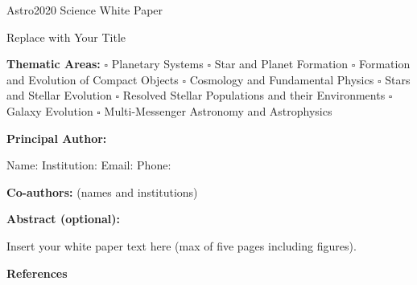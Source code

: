 \documentclass[12pt]{article}
\begin{document}
\raggedright
\huge
Astro2020 Science White Paper \linebreak

Replace with Your Title \linebreak
\normalsize

\noindent \textbf{Thematic Areas:} \hspace*{60pt} $\square$ Planetary Systems \hspace*{10pt} $\square$ Star and Planet Formation \hspace*{20pt}\linebreak
$\square$ Formation and Evolution of Compact Objects \hspace*{31pt} $\square$ Cosmology and Fundamental Physics \linebreak
  $\square$  Stars and Stellar Evolution \hspace*{1pt} $\square$ Resolved Stellar Populations and their Environments \hspace*{40pt} \linebreak
  $\square$    Galaxy Evolution   \hspace*{45pt} $\square$             Multi-Messenger Astronomy and Astrophysics \hspace*{65pt} \linebreak
  
\textbf{Principal Author:}

Name:	
 \linebreak						
Institution:  
 \linebreak
Email: 
 \linebreak
Phone:  
 \linebreak
 
\textbf{Co-authors:} (names and institutions)
  \linebreak

\textbf{Abstract  (optional):}


\pagebreak
Insert your white paper text here (max of five pages including figures).

\pagebreak
\textbf{References}
\end{document}
